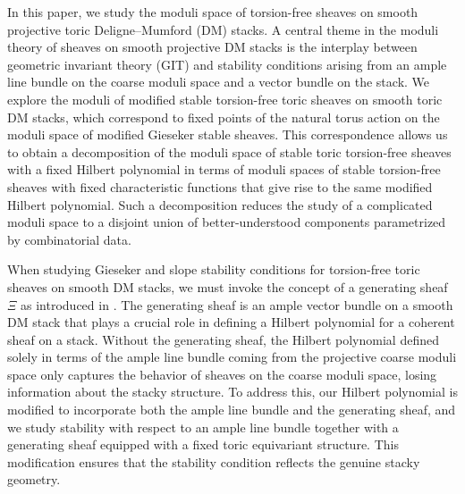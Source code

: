 \documentclass[10pt]{amsart}
\numberwithin{equation}{subsection}
\begin{document}
In this paper, we study the moduli space of torsion-free sheaves on smooth projective toric Deligne–Mumford (DM) stacks. A central theme in the moduli theory of sheaves on smooth projective DM stacks is the interplay between geometric invariant theory (GIT) and stability conditions arising from an ample line bundle on the coarse moduli space and a vector bundle on the stack. We explore the moduli of modified stable torsion-free toric sheaves on smooth toric DM stacks, which correspond to fixed points of the natural torus action on the moduli space of modified Gieseker stable sheaves. This correspondence allows us to obtain a decomposition of the moduli space of stable toric torsion-free sheaves with a fixed Hilbert polynomial in terms of moduli spaces of stable torsion-free sheaves with fixed characteristic functions that give rise to the same modified Hilbert polynomial. Such a decomposition reduces the study of a complicated moduli space to a disjoint union of better-understood components parametrized by combinatorial data.

When studying Gieseker and slope stability conditions for torsion-free toric sheaves on smooth DM stacks, we must invoke the concept of a generating sheaf $\Xi$ as introduced in \cite{Nir}. The generating sheaf is an ample vector bundle on a smooth DM stack that plays a crucial role in defining a Hilbert polynomial for a coherent sheaf on a stack. Without the generating sheaf, the Hilbert polynomial defined solely in terms of the ample line bundle coming from the projective coarse moduli space only captures the behavior of sheaves on the coarse moduli space, losing information about the stacky structure. To address this, our Hilbert polynomial is modified to incorporate both the ample line bundle and the generating sheaf, and we study stability with respect to an ample line bundle together with a generating sheaf equipped with a fixed toric equivariant structure. This modification ensures that the stability condition reflects the genuine stacky geometry.
\end{document}
